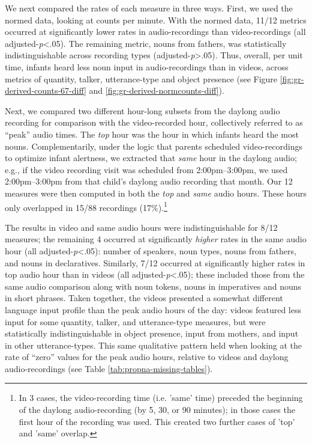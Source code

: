\documentclass[man]{apa6}
\theoremstyle{definition}
\theoremstyle{definition}
\theoremstyle{definition}
\theoremstyle{remark}
\begin{document}
We next compared the rates of each measure in three ways. First, we used
the normed data, looking at counts per minute. With the normed data,
11/12 metrics occurred at significantly lower rates in audio-recordings
than video-recordings (all adjusted-\emph{p}\textless{}.05). The
remaining metric, nouns from fathers, was statistically
indistinguishable across recording types
(adjusted-\emph{p}\textgreater{}.05). Thus, overall, per unit time,
infants heard less noun input in audio-recordings than in videos, across
metrics of quantity, talker, utterance-type and object presence (see
Figure \ref{fig:gr-derived-counts-67-diff} and
\ref{fig:gr-derived-normcounts-diff}).

Next, we compared two different hour-long subsets from the daylong audio
recording for comparison with the video-recorded hour, collectively
referred to as \enquote{peak} audio times. The \emph{top} hour was the
hour in which infants heard the most nouns. Complementarily, under the
logic that parents scheduled video-recordings to optimize infant
alertness, we extracted that \emph{same} hour in the daylong audio;
e.g., if the video recording visit was scheduled from 2:00pm--3:00pm, we
used 2:00pm--3:00pm from that child's daylong audio recording that
month. Our 12 measures were then computed in both the \emph{top} and
\emph{same} audio hours. These hours only overlapped in 15/88 recordings
(17\%).\footnote{In 3 cases, the video-recording time (i.e. 'same' time) preceded the beginning of the daylong audio-recording (by 5, 30, or 90 minutes); in those cases the first hour of the recording was used. This created two further cases of 'top' and 'same' overlap.}

The results in video and same audio hours were indistinguishable for
8/12 measures; the remaining 4 occurred at significantly \emph{higher}
rates in the same audio hour (all adjusted-\emph{p}\textless{}.05):
number of speakers, noun types, nouns from fathers, and nouns in
declaratives. Similarly, 7/12 occurred at significantly higher rates in
top audio hour than in videos (all adjusted-\emph{p}\textless{}.05);
these included those from the same audio comparison along with noun
tokens, nouns in imperatives and nouns in short phrases. Taken together,
the videos presented a somewhat different language input profile than
the peak audio hours of the day: videos featured less input for some
quantity, talker, and utterance-type measures, but were statistically
indistinguishable in object presence, input from mothers, and input in
other utterance-types. This same qualitative pattern held when looking
at the rate of \enquote{zero} values for the peak audio hours, relative
to videos and daylong audio-recordings (see Table
\ref{tab:propna-missing-tables}).
\end{document}
